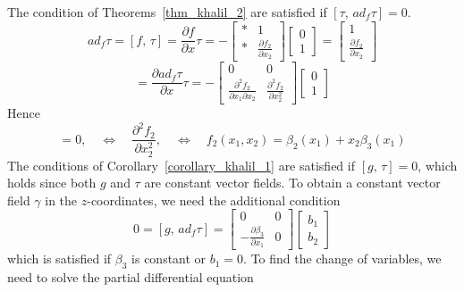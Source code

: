 \documentclass[12pt,a4paper,oneside]{book}
\begin{document}
\begin{onehalfspace}
\begin{example}
	The condition of Theorems~\ref{thm_khalil_2} are satisfied if $[\tau,\,ad_f\tau]=0$.
	\begin{equation*}
		ad_f\tau=[f,\,\tau]= \frac{\partial f}{\partial x}\tau=-\begin{bmatrix} * & 1 \\[6pt] * & \frac{\partial f_2}{\partial x_2} \end{bmatrix}\begin{bmatrix} 0 \\[6pt] 1 \end{bmatrix} = \begin{bmatrix} 1 \\[6pt] \frac{\partial f_2}{\partial x_2} \end{bmatrix}
	\end{equation*}
	\begin{equation*}
		[\tau,\,ad_f\tau]=\frac{\partial ad_f\tau}{\partial x}\tau	= -\begin{bmatrix} 0 & 0 \\[6pt] \frac{\partial^2 f_2}{\partial x_1\partial x_2} & \frac{\partial^2 f_2}{\partial x_2^2} \end{bmatrix}	\begin{bmatrix} 0 \\[6pt] 1 \end{bmatrix}
	\end{equation*}
	Hence
	\begin{equation*}
		[\tau,\,ad_f\tau]=0,\quad\Leftrightarrow\quad\frac{\partial^2 f_2}{\partial x_2^2},\quad\Leftrightarrow\quad f_2(x_1,x_2)=\beta_2(x_1)+x_2\beta_3(x_1)
	\end{equation*}
	The conditions of Corollary~\ref{corollary_khalil_1} are satisfied if $[g,\,\tau]=0$, which holds since both $g$ and $\tau$ are constant vector fields. To obtain a constant vector field $\gamma$ in the $z$-coordinates, we need the additional condition
	\begin{equation*}
		0=[g,\,ad_f\tau]=\begin{bmatrix} 0 & 0 \\[6pt] -\frac{\partial \beta_3}{\partial x_1} & 0 \end{bmatrix}\begin{bmatrix} b_1 \\[6pt] b_2 \end{bmatrix}
	\end{equation*}
	which is satisfied if $\beta_3$ is constant or $b_1=0$. To find the change of variables, we need to solve the partial differential equation
	\begin{equation*}

\end{equation*}
\end{example}
\end{onehalfspace}
\end{document}
